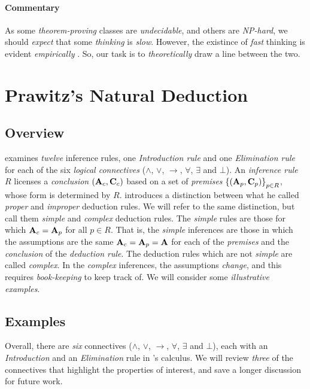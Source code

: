 \documentclass[11pt]{article}
\begin{document}
\paragraph{Commentary}
As some {\em theorem-proving} classes are {\em undecidable}, and others are {\em NP-hard}, we should {\em expect} that some {\em thinking} is {\em slow}.
However, the existince of {\em fast} thinking is evident {\em empirically} \cite{Kahneman2011ThinkingFast}.
So, our task is to {\em theoretically} draw a line between the two.

\section*{Prawitz's Natural Deduction}
\subsection*{Overview}
\cite{PrawitzNaturalDeduction} examines {\em twelve} inference rules, one {\em Introduction rule} and one {\em Elimination rule} for each of the six {\em logical connectives} ($\land$, $\lor$, $\rightarrow$, $\forall$, $\exists$ and $\bot$).
An {\em inference rule} $R$ licenses a {\em conclusion} $({\bf A}_c, {\bf C}_c)$ based on a set of {\em premises} $\left\{({\bf A}_p, {\bf C}_p)\right\}_{p\in R}$, whose form is determined by $R$.
\cite{PrawitzNaturalDeduction} introduces a distinction between what he called {\em proper} and {\em improper} deduction rules.
We will refer to the same distinction, but call them {\em simple} and {\em complex} deduction rules.
The {\em simple} rules are those for which ${\bf A}_c = {\bf A}_p$ for all $p \in R$.
That is, the {\em simple} inferences are those in which the assumptions are the same ${\bf A}_c = {\bf A}_p = {\bf A}$ for each of the {\em premises} and the {\em conclusion} of the {\em deduction rule}.
The deduction rules which are not {\em simple} are called {\em complex}.
In the {\em complex} inferences, the assumptions {\em change}, and this requires {\em book-keeping} to keep track of.
We will consider some {\em illustrative examples}.

\subsection*{Examples}
Overall, there are {\em six} connectives ($\land$, $\lor$, $\rightarrow$, $\forall$, $\exists$ and $\bot$), each with an {\em Introduction} and an {\em Elimination} rule in \cite{PrawitzNaturalDeduction}'s calculus.
We will review {\em three} of the connectives that highlight the properties of interest, and save a longer discussion for future work.
\end{document}
